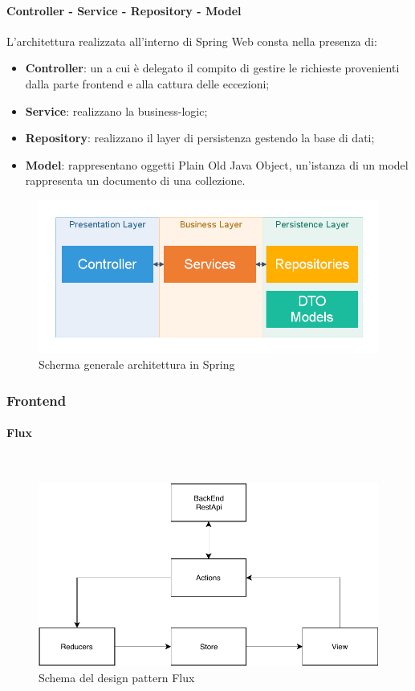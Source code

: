 \paragraph{Controller - Service - Repository - Model}
L'architettura realizzata all'interno di Spring Web consta nella presenza di:
\begin{itemize}
\item \textbf{Controller}: un a cui è delegato il compito di gestire le richieste provenienti dalla parte frontend e alla cattura delle eccezioni;
\item \textbf{Service}: realizzano la business-logic;
\item \textbf{Repository}: realizzano il layer di persistenza gestendo la base di dati;
\item \textbf{Model}: rappresentano oggetti  Plain Old Java Object, un'istanza di un model rappresenta un documento di una collezione.
\end{itemize}
\begin{figure}[H]
\centering
\includegraphics[width=14cm]{img/springArch.png}
\caption{Scherma generale architettura in Spring}
\end{figure}

\subsubsection{Frontend}
\paragraph{Flux}\mbox{}\\

\begin{figure}[H]
    \centering
	\includegraphics[width=0.7\linewidth]{img/Flux.pdf}
	\caption{Schema del design pattern Flux}
\end{figure}

